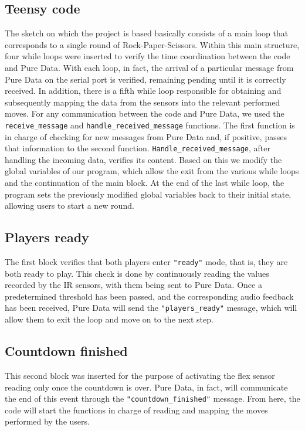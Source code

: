 \documentclass[11pt,a4paper]{report}
\begin{document}
\subsection*{Teensy code}
The sketch on which the project is based basically consists of a main loop that corresponds to a single round of Rock-Paper-Scissors.
Within this main structure, four while loops were inserted to verify the time coordination between the code and Pure Data. With each loop, in fact, the arrival of a particular message from Pure Data on the serial port is verified, remaining pending until it is correctly received. In addition, there is a fifth while loop responsible for obtaining and subsequently mapping the data from the sensors into the relevant performed moves.
For any communication between the code and Pure Data, we used the \texttt{receive\_message} and \texttt{handle\_received\_message} functions. The first function is in charge of checking for new messages from Pure Data and, if positive, passes that information to the second function.
\texttt{Handle\_received\_message}, after handling the incoming data, verifies its content. Based on this we modify the global variables of our program, which allow the exit from the various while loops and the continuation of the main block.
At the end of the last while loop, the program sets the previously modified global variables back to their initial state, allowing users to start a new round.
\subsection*{Players ready}
The first block verifies that both players enter \texttt{"ready"} mode, that is, they are both ready to play. This check is done by continuously reading the values recorded by the IR sensors, with them being sent to Pure Data. Once a predetermined threshold has been passed, and the corresponding audio feedback has been received, Pure Data will send the \texttt{"players\_ready"} message, which will allow them to exit the loop and move on to the next step.
\subsection*{Countdown finished}
This second block was inserted for the purpose of activating the flex sensor reading only once the countdown is over. Pure Data, in fact, will communicate the end of this event through the \texttt{"countdown\_finished"} message. From here, the code will start the functions in charge of reading and mapping the moves performed by the users.
\end{document}
